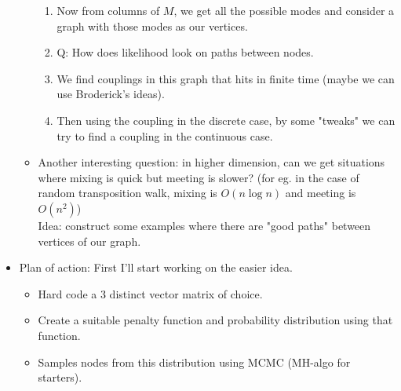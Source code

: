 \documentclass{article}
\begin{document}
\begin{itemize}
\begin{itemize}
\begin{enumerate}
      					\item Now from columns of $M$, we get all the possible modes and consider a graph with those modes as our vertices.
           				\item Q: How does likelihood look on paths between nodes.
           				\item We find couplings in this graph that hits  in finite time (maybe we can use Broderick's ideas).
               			\item Then using the coupling in the discrete case, by some "tweaks" we can try to find a coupling in the continuous case.
					\end{enumerate}
					\item Another interesting question: in higher dimension, can we get situations where mixing is quick but meeting is slower? (for eg. in the case of random transposition walk, mixing is $O(n\log n)$ and meeting is $O(n^2)$)\\
					Idea: construct some examples where there are "good paths" between vertices of our graph.
			\end{itemize}
		\item Plan of action:
			First I'll start working on the easier idea.
			\begin{itemize}
				\item Hard code a 3 distinct vector matrix of choice.
    			\item Create a suitable penalty function and probability distribution using that function.
    			\item Samples nodes from this distribution using MCMC (MH-algo for starters).
			\end{itemize}
	\end{itemize}
\end{document}
